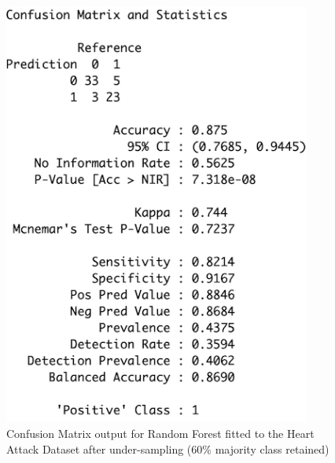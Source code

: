 \begin{figure}[!htbp]
\begin{minipage}{0.45\textwidth}
        \includegraphics[width=0.9\textwidth]{ThesisTemplate/appendix/images/Chapter5Appendix/ConfusionMatrix60/HA.png}
        \caption{Confusion Matrix output for Random Forest fitted to the Heart Attack Dataset after under-sampling (60\% majority class retained)}
        \label{fig:matrixHA60}
    \end{minipage}
\end{figure}

